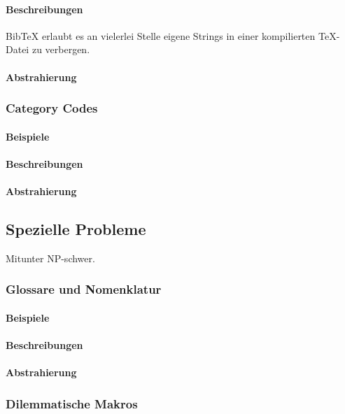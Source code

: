 \paragraph*{Beschreibungen}
Bib\TeX{} erlaubt es an vielerlei Stelle eigene Strings in einer kompilierten \TeX{}-Datei zu verbergen.
\paragraph*{Abstrahierung}




\subsubsection{Category Codes}\label{problems:advanced:catcode}
\paragraph*{Beispiele}
\paragraph*{Beschreibungen}
\paragraph*{Abstrahierung}


\subsection{Spezielle Probleme}\label{problems:special}
Mitunter NP-schwer.

\subsubsection{Glossare und Nomenklatur}\label{problems:special:glossaries}
\paragraph*{Beispiele}
\paragraph*{Beschreibungen}
\paragraph*{Abstrahierung}

\subsubsection{Dilemmatische Makros}\label{problems:special:macrodilemma}
